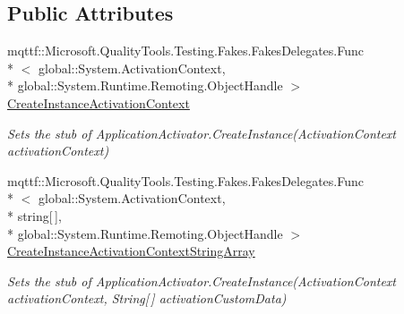 \subsection*{Public Attributes}
\begin{DoxyCompactItemize}
\item 
mqttf\-::\-Microsoft.\-Quality\-Tools.\-Testing.\-Fakes.\-Fakes\-Delegates.\-Func\\*
$<$ global\-::\-System.\-Activation\-Context, \\*
global\-::\-System.\-Runtime.\-Remoting.\-Object\-Handle $>$ \hyperlink{class_system_1_1_runtime_1_1_hosting_1_1_fakes_1_1_stub_application_activator_abcf28a4ee6fdbe04bf2eb2d69d0aaa01}{Create\-Instance\-Activation\-Context}
\begin{DoxyCompactList}\small\item\em Sets the stub of Application\-Activator.\-Create\-Instance(\-Activation\-Context activation\-Context)\end{DoxyCompactList}\item 
mqttf\-::\-Microsoft.\-Quality\-Tools.\-Testing.\-Fakes.\-Fakes\-Delegates.\-Func\\*
$<$ global\-::\-System.\-Activation\-Context, \\*
string\mbox{[}$\,$\mbox{]}, \\*
global\-::\-System.\-Runtime.\-Remoting.\-Object\-Handle $>$ \hyperlink{class_system_1_1_runtime_1_1_hosting_1_1_fakes_1_1_stub_application_activator_a0eae18efea614d799cda1fa800abacb9}{Create\-Instance\-Activation\-Context\-String\-Array}
\begin{DoxyCompactList}\small\item\em Sets the stub of Application\-Activator.\-Create\-Instance(\-Activation\-Context activation\-Context, String\mbox{[}$\,$\mbox{]} activation\-Custom\-Data)\end{DoxyCompactList}\end{DoxyCompactItemize}
